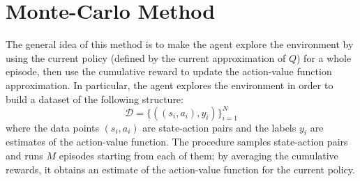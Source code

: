 \documentclass[10pt, a4paper]{report}
\begin{document}
\section{Monte-Carlo Method}
The general idea of this method is to make the agent explore the environment by using the current policy (defined by the current approximation of $Q$) for a whole episode, then use the cumulative reward to update the action-value function approximation. In particular, the agent explores the environment in order to build a dataset of the following structure:
\begin{equation}
    \mathcal D = \{((s_i,a_i),y_i)\}_{i=1}^N
\end{equation}
where the data points $(s_i,a_i)$ are state-action pairs and the labels $y_i$ are estimates of the action-value function.
The procedure samples state-action pairs and runs $M$ episodes starting from each of them; by averaging the cumulative rewards, it obtains an estimate of the action-value function for the current policy.
\end{document}
